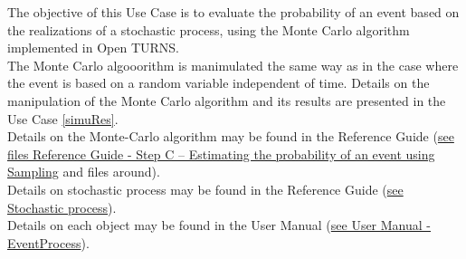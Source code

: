 \renewcommand{\filename}{docUC_StocProc_MonteCarlo.tex}
\renewcommand{\filetitle}{UC : Probability of a process event}

\HeaderIIILevel

\label{MonteCarloProcess}




The objective of this Use Case is to evaluate the probability of an event based on the  realizations of a stochastic process, using the Monte Carlo algorithm implemented in Open TURNS.\\

The Monte Carlo algooorithm is manimulated the same way as in the case where the event is based on a random variable independent of time. Details on the manipulation of the Monte Carlo algorithm and its results are presented in the Use Case  \ref{simuRes}. \\


Details on the Monte-Carlo algorithm may be found in the Reference Guide (\href{OpenTURNS_ReferenceGuide.pdf}{see files Reference Guide - Step C -- Estimating the probability of an event using Sampling} and files around).\\
Details on stochastic process may be found in the Reference Guide (\href{OpenTURNS_ReferenceGuide.pdf}{see Stochastic process}).\\
Details on each object may be found in the User Manual  (\href{OpenTURNS_UserManual_TUI.pdf}{see User Manual - EventProcess}).\\


